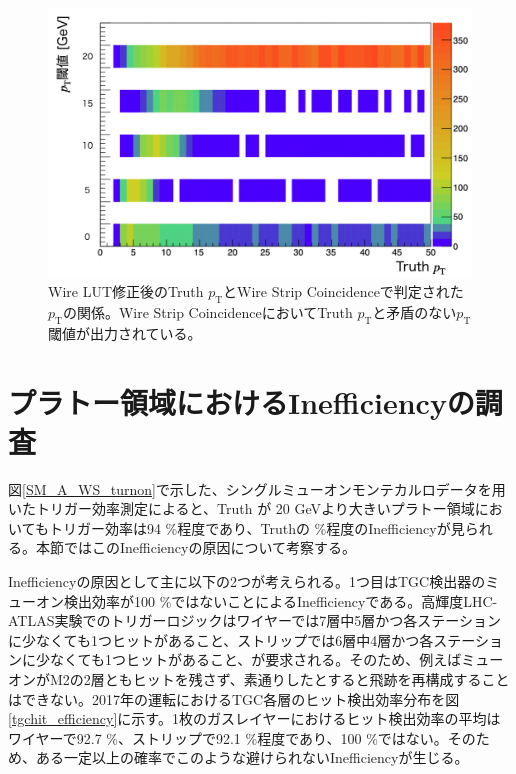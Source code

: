 \begin{figure} 
\centering
\includegraphics[width=16cm]{fig/Test/pt_after.png}
\caption[]{Wire LUT修正後のTruth $p_\mathrm{T}$とWire Strip Coincidenceで判定された$p_\mathrm{T}$の関係。Wire Strip CoincidenceにおいてTruth $p_\mathrm{T}$と矛盾のない$p_\mathrm{T}$ 閾値が出力されている。}
\label{pt_after}
\end{figure}






\clearpage
\section{プラトー領域におけるInefficiencyの調査}
\label{sec:appendix:plateau}
図\ref{SM_A_WS_turnon}で示した、シングルミューオンモンテカルロデータを用いたトリガー効率測定によると、Truth \pt が 20 GeVより大きいプラトー領域においてもトリガー効率は94 \%程度であり、Truthの \%程度のInefficiencyが見られる。本節ではこのInefficiencyの原因について考察する。

Inefficiencyの原因として主に以下の2つが考えられる。1つ目はTGC検出器のミューオン検出効率が100 \%ではないことによるInefficiencyである。高輝度LHC-ATLAS実験でのトリガーロジックはワイヤーでは7層中5層かつ各ステーションに少なくても1つヒットがあること、ストリップでは6層中4層かつ各ステーションに少なくても1つヒットがあること、が要求される。そのため、例えばミューオンがM2の2層ともヒットを残さず、素通りしたとすると飛跡を再構成することはできない。2017年の運転におけるTGC各層のヒット検出効率分布を図\ref{tgchit_efficiency}に示す。1枚のガスレイヤーにおけるヒット検出効率の平均はワイヤーで92.7 \%、ストリップで92.1 \%程度であり、100 \%ではない。そのため、ある一定以上の確率でこのような避けられないInefficiencyが生じる。

